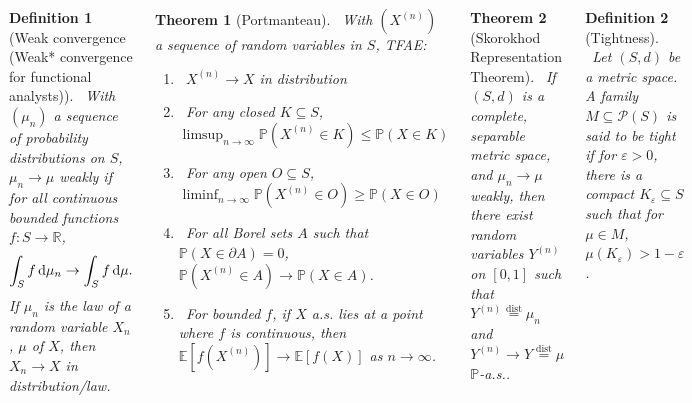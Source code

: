 \documentclass{tikzposter} %
\newcommand{\mc}{\mathcal}
\renewcommand\P[1]{\mathbb{P}\left(#1\right)}
\newcommand\Pj{\mathbb{P}}
\newcommand\E[1]{\mathbb{E}\left[#1\right]}
\let\textd\d
\renewcommand{\d}{%
  \ifmmode
    \mathrm{d}%
  \else
    \textd%
  \fi
}
\newtheorem{theorem}{Theorem}
\newtheorem{definition}{Definition}
\begin{document}
\begin{columns}
{    \begin{definition}[Weak convergence (Weak* convergence for functional analysts)]
    \ With $(\mu_n)$ a sequence of probability distributions on $S$, $\mu_n \to \mu$ weakly if for all continuous bounded functions $f : S \to \mathbb{R}$,
    \begin{align*}
      \int_S f \,\d\mu_n \to \int_S f \,\d \mu.
    \end{align*}
    If $\mu_n$ is the law of a random variable $X_n$, $\mu$ of $X$, then $X_n \to X$ in distribution/law.
    \end{definition}
    \hphantom{}

    \begin{theorem}[Portmanteau]
    \ With $(X^{(n)})$ a sequence of random variables in $S$, TFAE:
    \begin{enumerate}[label=(\roman*)]
            \item \ $X^{(n)} \to X$ in distribution
            \item \ For any closed $K \subseteq S$, $\displaystyle \limsup_{n \to \infty} \Pj(X^{(n)} \in K) \le \Pj(X \in K)$
      \item \ For any open $O \subseteq S$, $\displaystyle \liminf_{n \to \infty} \Pj(X^{(n)} \in O) \ge \Pj(X \in O)$
            \item \ For all Borel sets $A$ such that $\Pj(X \in \partial A) = 0$, $\P{X^{(n)} \in A} \to \P{X \in A}$.
            \item \ For bounded $f$, if $X$ a.s. lies at a point where $f$ is continuous, then $\E{f(X^{(n)})} \to \E{f(X)}$ as $n \to \infty$.
    \end{enumerate}
    \end{theorem}

    \begin{theorem}[Skorokhod Representation Theorem]
    \ If $(S, d)$ is a complete, separable metric space, and $\mu_n \to \mu$ weakly, then there exist random variables $Y^{(n)}$ on $[0, 1]$ such that $Y^{(n)} \overset{\mathrm{dist}}{=} \mu_n$ and $Y^{(n)} \to Y \overset{\mathrm{dist}}{=} \mu$ $\Pj$-a.s..
    \end{theorem}
    \hphantom{}

    \begin{definition}[Tightness]
    \ Let $(S, d)$ be a metric space. A family $M \subseteq \mc{P}(S)$ is said to be tight if for $\varepsilon > 0$, there is a compact $K_{\varepsilon} \subseteq S$ such that for $\mu \in M$, $\mu(K_{\varepsilon}) > 1 - \varepsilon$.
    \end{definition}
    \hphantom{}

}
\end{columns}
\end{document}
